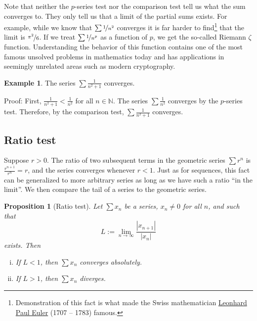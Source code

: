 \documentclass[12pt]{book}
\newcommand{\abs}[1]{\left\lvert {#1} \right\rvert}
\newcommand{\N}{{\mathbb{N}}}
\theoremstyle{plain}
\newtheorem{prop}[thm]{Proposition}
\theoremstyle{remark}
\theoremstyle{definition}
\theoremstyle{exercise}
\theoremstyle{example}
\newtheorem{example}[thm]{Example}
\begin{document}
Note that neither the $p$-series test nor the comparison test 
tell us what the sum converges to.  They only tell us that a limit
of the partial sums exists.  For example, while we know that
$\sum \nicefrac{1}{n^2}$ converges it is far harder to
find\footnote{Demonstration of this fact is
what made the Swiss mathematician
\href{http://en.wikipedia.org/wiki/Leonhard_Euler}{Leonhard Paul Euler} (1707 -- 1783)
famous.}
that the limit is $\nicefrac{\pi^2}{6}$.
If we treat $\sum \nicefrac{1}{n^p}$ as a function of $p$,
we get the so-called Riemann $\zeta$ function.  Understanding the
behavior of this function contains
one of the most famous unsolved problems in mathematics today and has applications
in seemingly unrelated areas such as modern cryptography.

\begin{example}
The series $\sum \frac{1}{n^2+1}$ converges.

Proof:  First, $\frac{1}{n^2+1} < \frac{1}{n^2}$ for all $n \in \N$.
The series $\sum \frac{1}{n^2}$ converges by the $p$-series test.
Therefore, by the comparison test, $\sum \frac{1}{n^2+1}$ converges.
\end{example}

\subsection{Ratio test}

Suppose $r > 0$.  The ratio of two subsequent terms in the geometric series $\sum
r^n$ is $\frac{r^{n+1}}{r^n} = r$, and the series converges
whenever $r < 1$.  Just as for sequences, this fact
can be generalized to more arbitrary series
as long as we have such a ratio ``in the limit''.  We then compare
the tail of a series to the geometric series.


\begin{prop}[Ratio test]
Let $\sum x_n$ be a series, $x_n \not= 0$ for all $n$, and such that
\begin{equation*}
L := \lim_{n\to\infty} \frac{\abs{x_{n+1}}}{\abs{x_n}}
\end{equation*}
exists.  Then
\begin{enumerate}[(i)]
\item
If $L < 1$, then $\sum x_n$ converges absolutely.
\item
If $L > 1$, then $\sum x_n$ diverges.
\end{enumerate}
\end{prop}
\end{document}
